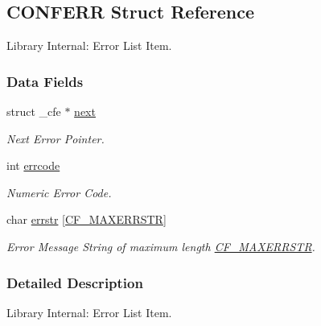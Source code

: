 \hypertarget{struct_c_o_n_f_e_r_r}{\subsection{C\-O\-N\-F\-E\-R\-R Struct Reference}
\label{struct_c_o_n_f_e_r_r}
}


Library Internal\-: Error List Item.  


\subsubsection*{Data Fields}
\begin{DoxyCompactItemize}
\item 
\hypertarget{struct_c_o_n_f_e_r_r_a01f9312e88fd2fd11acf5d854174a8f2}{struct \-\_\-cfe $\ast$ \hyperlink{struct_c_o_n_f_e_r_r_a01f9312e88fd2fd11acf5d854174a8f2}{next}}\label{struct_c_o_n_f_e_r_r_a01f9312e88fd2fd11acf5d854174a8f2}

\begin{DoxyCompactList}\small\item\em Next Error Pointer. \end{DoxyCompactList}\item 
\hypertarget{struct_c_o_n_f_e_r_r_a1966ad99f7a71739f0cddb2e282eb8f4}{int \hyperlink{struct_c_o_n_f_e_r_r_a1966ad99f7a71739f0cddb2e282eb8f4}{errcode}}\label{struct_c_o_n_f_e_r_r_a1966ad99f7a71739f0cddb2e282eb8f4}

\begin{DoxyCompactList}\small\item\em Numeric Error Code. \end{DoxyCompactList}\item 
\hypertarget{struct_c_o_n_f_e_r_r_a29ab06af0474053fff2cb208d048fd4b}{char \hyperlink{struct_c_o_n_f_e_r_r_a29ab06af0474053fff2cb208d048fd4b}{errstr} \mbox{[}\hyperlink{group__cflib__core_gaf78e4b950c9aa49b752e4460342ea3bf}{C\-F\-\_\-\-M\-A\-X\-E\-R\-R\-S\-T\-R}\mbox{]}}\label{struct_c_o_n_f_e_r_r_a29ab06af0474053fff2cb208d048fd4b}

\begin{DoxyCompactList}\small\item\em Error Message String of maximum length \hyperlink{group__cflib__core_gaf78e4b950c9aa49b752e4460342ea3bf}{C\-F\-\_\-\-M\-A\-X\-E\-R\-R\-S\-T\-R}. \end{DoxyCompactList}\end{DoxyCompactItemize}


\subsubsection{Detailed Description}
Library Internal\-: Error List Item. 
